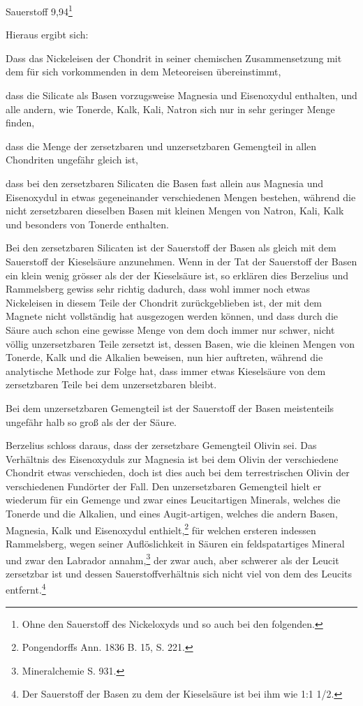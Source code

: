 \documentclass[a4paper, 11pt, oneside]{article}
\begin{document}
Sauerstoff 9,94\footnote{Ohne den Sauerstoff des Nickeloxyds und so auch bei den folgenden.}

Hieraus ergibt sich:

Dass das Nickeleisen der Chondrit in seiner chemischen Zusammensetzung mit dem für sich vorkommenden in dem Meteoreisen übereinstimmt, 

dass die Silicate als Basen vorzugsweise Magnesia und Eisenoxydul enthalten, und alle andern, wie Tonerde, Kalk, Kali, Natron sich nur in sehr geringer Menge finden,

dass die Menge der zersetzbaren und unzersetzbaren Gemengteil in allen Chondriten ungefähr gleich ist,

dass bei den zersetzbaren Silicaten die Basen fast allein aus Magnesia und Eisenoxydul in etwas gegeneinander verschiedenen Mengen bestehen, während die nicht zersetzbaren dieselben Basen mit kleinen Mengen von Natron, Kali, Kalk und besonders von Tonerde enthalten.

Bei den zersetzbaren Silicaten ist der Sauerstoff der Basen als gleich mit dem Sauerstoff der Kieselsäure anzunehmen. Wenn in der Tat der Sauerstoff der Basen ein klein wenig grösser als der der Kieselsäure ist, so erklären dies Berzelius und Rammelsberg gewiss sehr richtig dadurch, dass wohl immer noch etwas Nickeleisen in diesem Teile der Chondrit zurückgeblieben ist, der mit dem Magnete nicht vollständig hat ausgezogen werden können, und dass durch die Säure auch schon eine gewisse Menge von dem doch immer nur schwer, nicht völlig unzersetzbaren Teile zersetzt ist, dessen Basen, wie die kleinen Mengen von Tonerde, Kalk und die Alkalien beweisen, nun hier auftreten, während die analytische Methode zur Folge hat, dass immer etwas Kieselsäure von dem zersetzbaren Teile bei dem unzersetzbaren bleibt.

Bei dem unzersetzbaren Gemengteil ist der Sauerstoff der Basen meistenteils ungefähr halb so groß als der der Säure.

Berzelius schloss daraus, dass der zersetzbare Gemengteil Olivin sei. Das Verhältnis des Eisenoxyduls zur Magnesia ist bei dem Olivin der verschiedene Chondrit etwas verschieden, doch ist dies auch bei dem terrestrischen Olivin der verschiedenen Fundörter der Fall. Den unzersetzbaren Gemengteil hielt er wiederum für ein Gemenge und zwar eines Leucitartigen Minerals, welches die Tonerde und die Alkalien, und eines Augit-artigen, welches die andern Basen, Magnesia, Kalk und Eisenoxydul enthielt,\footnote{Pongendorffs Ann. 1836 B. 15, S. 221.} für welchen ersteren indessen Rammelsberg, wegen seiner Auflöslichkeit in Säuren ein feldspatartiges Mineral und zwar den Labrador annahm,\footnote{Mineralchemie S. 931.} der zwar auch, aber schwerer als der Leucit zersetzbar ist und dessen Sauerstoffverhältnis sich nicht viel von dem des Leucits entfernt.\footnote{Der Sauerstoff der Basen zu dem der Kieselsäure ist bei ihm wie 1:1 1/2.}
\end{document}
